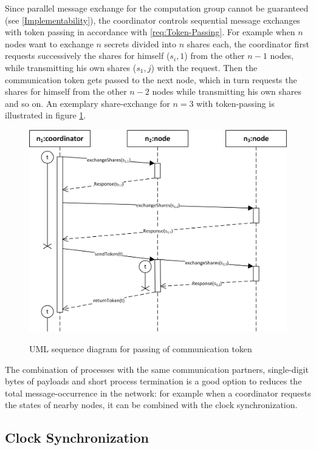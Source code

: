 		Since parallel message exchange for the computation group cannot be guaranteed (see \ref{Implementability}), the coordinator controls sequential message exchanges with token passing in accordance with \ref{req:Token-Passing}. For example when $n$ nodes want to exchange $n$ secrets divided into $n$ shares each, the coordinator first requests successively the shares for himself ($s_i,1$) from the other $n-1$ nodes, while transmitting his own shares ($s_1,j$) with the request. Then the communication token gets passed to the next node, which in turn requests the shares for himself from the other $n-2$ nodes while transmitting his own shares and so on. An exemplary share-exchange for $n=3$ with token-passing is illustrated in figure \ref{figure:coordinator token passing}.
		
		\begin{figure}[!htb] %
		\caption{\gls{UML} sequence diagram for passing of communication token}
		\includegraphics[scale=1.0]{figures/token-passing.png}
		\label{figure:coordinator token passing}
		\end{figure}
		
		The combination of processes with the same communication partners, single-digit bytes of payloads and short process termination is a good option to reduces the total message-occurrence in the network: for example when a coordinator requests the states of nearby nodes, it can be combined with the clock synchronization.
		
		\FloatBarrier
		\subsection{Clock Synchronization}
		\label{Clock synchronization}
		
